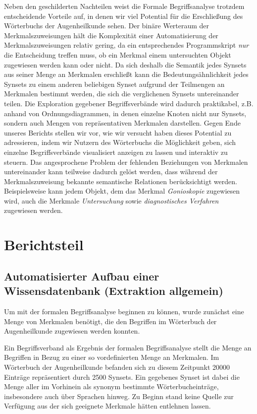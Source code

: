 \documentclass[pagesize,DIV=calc,12pt,draft]{scrreprt}
\begin{document}
Neben den geschilderten Nachteilen weist die Formale Begriffsanalyse
trotzdem entscheidende Vorteile auf, in denen wir viel Potential für die
Erschließung des Wörterbuchs der Augenheilkunde sehen. Der binäre
Werteraum der Merkmalszuweisungen hält die Komplexität einer
Automatisierung der Merkmalszuweisungen relativ gering, da ein
entsprechendes Programmskript \emph{nur} die Entscheidung treffen muss,
ob ein Merkmal einem untersuchten Objekt zugewiesen werden kann oder
nicht. Da sich deshalb die Semantik jedes Synsets aus seiner Menge an
Merkmalen erschließt kann die Bedeutungsähnlichkeit jedes Synsets zu
einem anderen beliebigen Synset aufgrund der Teilmengen an Merkmalen
bestimmt werden, die sich die verglichenen Synsets untereinander teilen.
Die Exploration gegebener Begriffsverbände wird dadurch praktikabel,
z.B. anhand von Ordnungsdiagrammen, in denen einzelne Knoten nicht nur
Synsets, sondern auch Mengen von repräsentativen Merkmalen darstellen.
Gegen Ende unseres Berichts stellen wir vor, wie wir versucht haben
dieses Potential zu adressieren, indem wir Nutzern des Wörterbuchs die
Möglichkeit geben, sich einzelne Begriffsverbände visualisiert anzeigen
zu lassen und interaktiv zu steuern. Das angesprochene Problem der
fehlenden Beziehungen von Merkmalen untereinander kann teilweise dadurch
gelöst werden, dass während der Merkmalszuweisung bekannte semantische
Relationen berücksichtigt werden. Beispielsweise kann jedem Objekt, dem
das Merkmal \emph{Gonioskopie} zugewiesen wird, auch die Merkmale
\emph{Untersuchung} sowie \emph{diagnostisches Verfahren} zugewiesen
werden.

\chapter{Berichtsteil}

\section{Automatisierter Aufbau einer Wissensdatenbank (Extraktion
allgemein)}

Um mit der formalen Begriffsanalyse beginnen zu können, wurde zunächst
eine Menge von Merkmalen benötigt, die den Begriffen im Wörterbuch der
Augenheilkunde zugewiesen werden konnten.

Ein Begriffsverband als Ergebnis der formalen Begriffsanalyse stellt die
Menge an Begriffen in Bezug zu einer so vordefinierten Menge an
Merkmalen. Im Wörterbuch der Augenheilkunde befanden sich zu diesem
Zeitpunkt 20000 Einträge repräsentiert durch 2500 Synsets. Ein gegebenes
Synset ist dabei die Menge aller im Vorhinein als synonym bestimmte
Wörterbucheinträge, insbesondere auch über Sprachen hinweg. Zu Beginn
stand keine Quelle zur Verfügung aus der sich geeignete Merkmale hätten
entlehnen lassen.
\end{document}
